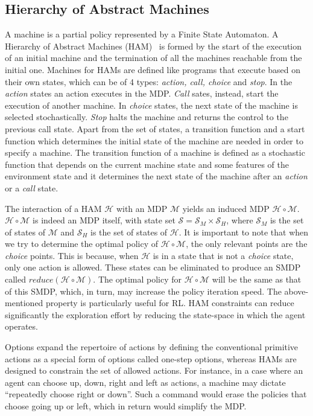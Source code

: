 \subsection{Hierarchy of Abstract Machines}

A machine is a partial policy represented by a Finite State Automaton. A Hierarchy of Abstract Machines (HAM)~\cite{Parr1997ReinforcementLW} is formed by the start of the execution of an initial machine and the termination of all the machines reachable from the initial one. Machines for HAMs are defined like programs that execute based on their own states, which can be of 4 types: \textit{action, call, choice} and \textit{stop}. In the \textit{action} states an action executes in the MDP. \textit{Call} sates, instead, start the execution of another machine. In \textit{choice} states, the next state of the machine is selected stochastically. \textit{Stop} halts the machine and returns the control to the previous call state. Apart from the set of states, a transition function and a start function which determines the initial state of the machine are needed in order to specify a machine. The transition function of a machine is defined as a stochastic function that depends on the current machine state and some features of the environment state and it determines the next state of the machine after an \textit{action} or a \textit{call} state. 

The interaction of a HAM $\mathcal{H}$ with an MDP $\mathcal{M}$ yields an induced MDP $\mathcal{H}\circ\mathcal{M}$. $\mathcal{H}\circ\mathcal{M}$ is indeed an MDP itself, with state set $\mathcal{S} = \mathcal{S}_M \times \mathcal{S}_H$, where $\mathcal{S}_M$ is the set of states of $\mathcal{M}$ and $\mathcal{S}_H$ is the set of states of $\mathcal{H}$. It is important to note that when we try to determine the optimal policy of $\mathcal{H}\circ\mathcal{M}$, the only relevant points are the \textit{choice} points. This is because, when $\mathcal{H}$ is in a state that is not a \textit{choice} state, only one action is allowed. These states can be eliminated to produce an SMDP called $\mathit{reduce}(\mathcal{H}\circ\mathcal{M})$. The optimal policy for $\mathcal{H}\circ\mathcal{M}$ will be the same as that of this SMDP, which, in turn, may increase the policy iteration speed. The above-mentioned property is particularly useful for RL. HAM constraints can reduce significantly the exploration effort by reducing the state-space in which the agent operates.

Options expand the repertoire of actions by defining the conventional primitive actions as a special form of options called one-step options, whereas HAMs are designed to constrain the set of allowed actions. For instance, in a case where an agent can choose up, down, right and left as actions, a machine may dictate “repeatedly choose right or down”. Such a command would erase the policies that choose  going up or left, which in return would simplify the MDP.

